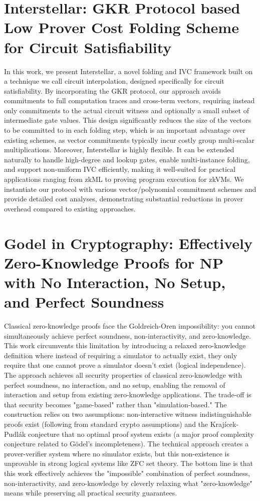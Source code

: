 \documentclass[11pt]{article}
\theoremstyle{definition}
\theoremstyle{remark}
\theoremstyle{plain}
\begin{document}
\section{\cite{Interstellar} Interstellar: GKR Protocol based Low Prover Cost Folding Scheme for Circuit Satisfiability}
In this work, we present Interstellar, a novel folding and IVC framework built on a technique we call circuit interpolation, designed specifically for circuit satisfiability. By incorporating the GKR protocol, our approach avoids commitments to full computation traces and cross-term vectors, requiring instead only commitments to the actual circuit witness and optionally a small subset of intermediate gate values. This design significantly reduces the size of the vectors to be committed to in each folding step, which is an important advantage over existing schemes, as vector commitments typically incur costly group multi-scalar multiplications. Moreover, Interstellar is highly flexible. It can be extended naturally to handle high-degree and lookup gates, enable multi-instance folding, and support non-uniform IVC efficiently, making it well-suited for practical applications ranging from zkML to proving program execution for zkVMs. We instantiate our protocol with various vector/polynomial commitment schemes and provide detailed cost analyses, demonstrating substantial reductions in prover overhead compared to existing approaches.
\section{\cite{Godel} Godel in Cryptography: Effectively Zero-Knowledge Proofs for NP with No Interaction, No Setup, and Perfect Soundness}
Classical zero-knowledge proofs face the Goldreich-Oren impossibility: you cannot simultaneously achieve perfect soundness, non-interactivity, and zero-knowledge. This work circumvents this limitation by introducing a relaxed zero-knowledge definition where instead of requiring a simulator to actually exist, they only require that one cannot prove a simulator doesn't exist (logical independence).
The approach achieves all security properties of classical zero-knowledge with perfect soundness, no interaction, and no setup, enabling the removal of interaction and setup from existing zero-knowledge applications. The trade-off is that security becomes "game-based" rather than "simulation-based."
The construction relies on two assumptions: non-interactive witness indistinguishable proofs exist (following from standard crypto assumptions) and the Krajícek-Pudlák conjecture that no optimal proof system exists (a major proof complexity conjecture related to Gödel's incompleteness). The technical approach creates a prover-verifier system where no simulator exists, but this non-existence is unprovable in strong logical systems like ZFC set theory.
The bottom line is that this work effectively achieves the "impossible" combination of perfect soundness, non-interactivity, and zero-knowledge by cleverly relaxing what "zero-knowledge" means while preserving all practical security guarantees.
\end{document}
